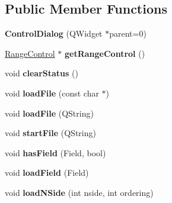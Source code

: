 \subsection*{Public Member Functions}
\begin{DoxyCompactItemize}
\item 
\hypertarget{classControlDialog_aa88e91e251f0e78ecae9eccf44e42bf8}{
{\bfseries ControlDialog} (QWidget $\ast$parent=0)}
\label{classControlDialog_aa88e91e251f0e78ecae9eccf44e42bf8}

\item 
\hypertarget{classControlDialog_ac8a6008cddd0308efba1b63132702cd6}{
\hyperlink{classRangeControl}{RangeControl} $\ast$ {\bfseries getRangeControl} ()}
\label{classControlDialog_ac8a6008cddd0308efba1b63132702cd6}

\item 
\hypertarget{classControlDialog_a48e419d4897cfb16ac8e774655ca0511}{
void {\bfseries clearStatus} ()}
\label{classControlDialog_a48e419d4897cfb16ac8e774655ca0511}

\item 
\hypertarget{classControlDialog_ad7db881d8f99eab986b8a4deb381b210}{
void {\bfseries loadFile} (const char $\ast$)}
\label{classControlDialog_ad7db881d8f99eab986b8a4deb381b210}

\item 
\hypertarget{classControlDialog_ae2f129ce217322a74147a189e8b97668}{
void {\bfseries loadFile} (QString)}
\label{classControlDialog_ae2f129ce217322a74147a189e8b97668}

\item 
\hypertarget{classControlDialog_ad27174d7a596be880ba3527819e94699}{
void {\bfseries startFile} (QString)}
\label{classControlDialog_ad27174d7a596be880ba3527819e94699}

\item 
\hypertarget{classControlDialog_a93967ef2c71064094ba37a36ac26b984}{
void {\bfseries hasField} (Field, bool)}
\label{classControlDialog_a93967ef2c71064094ba37a36ac26b984}

\item 
\hypertarget{classControlDialog_a9f9507d31a5eab6b0b81c5b620ef4e45}{
void {\bfseries loadField} (Field)}
\label{classControlDialog_a9f9507d31a5eab6b0b81c5b620ef4e45}

\item 
\hypertarget{classControlDialog_a6fa03289f5ad6b1ced42dd78d5e79ec8}{
void {\bfseries loadNSide} (int nside, int ordering)}
\label{classControlDialog_a6fa03289f5ad6b1ced42dd78d5e79ec8}


\end{DoxyCompactItemize}
